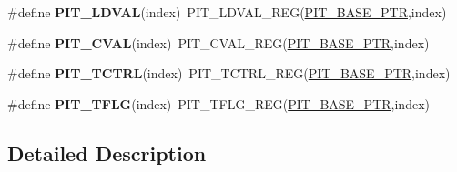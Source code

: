 \begin{DoxyCompactItemize}
\item 
\mbox{\label{group___p_i_t___register___accessor___macros_ga20130f3194e1cc2dfe6a6e863cac6bb0}} 
\#define {\bfseries P\+I\+T\+\_\+\+L\+D\+V\+AL}(index)~P\+I\+T\+\_\+\+L\+D\+V\+A\+L\+\_\+\+R\+EG(\hyperlink{group___p_i_t___peripheral_ga70be45f58402a8e6d2ce4df7b23aa41c}{P\+I\+T\+\_\+\+B\+A\+S\+E\+\_\+\+P\+TR},index)
\item 
\mbox{\label{group___p_i_t___register___accessor___macros_ga83f3e2fa179556c64aec46ba2a4ff9c2}} 
\#define {\bfseries P\+I\+T\+\_\+\+C\+V\+AL}(index)~P\+I\+T\+\_\+\+C\+V\+A\+L\+\_\+\+R\+EG(\hyperlink{group___p_i_t___peripheral_ga70be45f58402a8e6d2ce4df7b23aa41c}{P\+I\+T\+\_\+\+B\+A\+S\+E\+\_\+\+P\+TR},index)
\item 
\mbox{\label{group___p_i_t___register___accessor___macros_ga8208039ad04ced0f69ccc2cf4efd8e67}} 
\#define {\bfseries P\+I\+T\+\_\+\+T\+C\+T\+RL}(index)~P\+I\+T\+\_\+\+T\+C\+T\+R\+L\+\_\+\+R\+EG(\hyperlink{group___p_i_t___peripheral_ga70be45f58402a8e6d2ce4df7b23aa41c}{P\+I\+T\+\_\+\+B\+A\+S\+E\+\_\+\+P\+TR},index)
\item 
\mbox{\label{group___p_i_t___register___accessor___macros_ga8a2ba0e5f954639237f66f2613c60023}} 
\#define {\bfseries P\+I\+T\+\_\+\+T\+F\+LG}(index)~P\+I\+T\+\_\+\+T\+F\+L\+G\+\_\+\+R\+EG(\hyperlink{group___p_i_t___peripheral_ga70be45f58402a8e6d2ce4df7b23aa41c}{P\+I\+T\+\_\+\+B\+A\+S\+E\+\_\+\+P\+TR},index)
\end{DoxyCompactItemize}


\subsection{Detailed Description}
